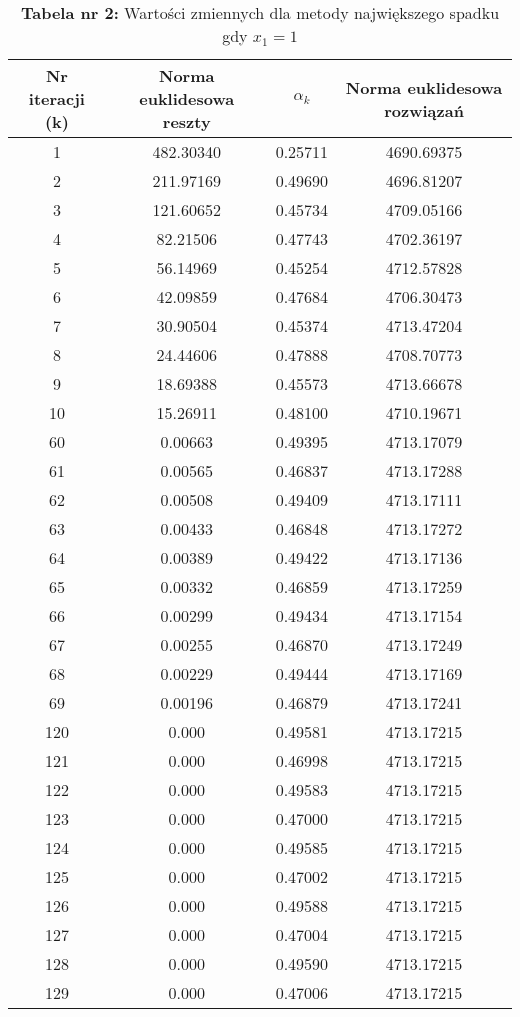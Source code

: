 \documentclass{article}
\begin{document}
\begin{table}[htbp]
\centering
\caption*{\textbf{Tabela nr 2:} Wartości zmiennych dla metody największego spadku gdy $x_1 = 1$}
\label{tab:moja_druga_tabela}
\begin{tabular}{cccc}
\toprule
Nr iteracji (k) & Norma euklidesowa reszty & $\alpha_k$ & Norma euklidesowa rozwiązań \\
\midrule
1 & 482.30340 & 0.25711 & 4690.69375 \\
2 & 211.97169 & 0.49690 & 4696.81207 \\
3 & 121.60652 & 0.45734 & 4709.05166 \\
4 & 82.21506 & 0.47743 & 4702.36197 \\
5 & 56.14969 & 0.45254 & 4712.57828 \\
6 & 42.09859 & 0.47684 & 4706.30473 \\
7 & 30.90504 & 0.45374 & 4713.47204 \\
8 & 24.44606 & 0.47888 & 4708.70773 \\
9 & 18.69388 & 0.45573 & 4713.66678 \\
10 & 15.26911 & 0.48100 & 4710.19671 \\
\midrule
60 & 0.00663 & 0.49395 & 4713.17079 \\
61 & 0.00565 & 0.46837 & 4713.17288 \\
62 & 0.00508 & 0.49409 & 4713.17111 \\
63 & 0.00433 & 0.46848 & 4713.17272 \\
64 & 0.00389 & 0.49422 & 4713.17136 \\
65 & 0.00332 & 0.46859 & 4713.17259 \\
66 & 0.00299 & 0.49434 & 4713.17154 \\
67 & 0.00255 & 0.46870 & 4713.17249 \\
68 & 0.00229 & 0.49444 & 4713.17169 \\
69 & 0.00196 & 0.46879 & 4713.17241 \\
\midrule
120 & 0.000 & 0.49581 & 4713.17215 \\
121 & 0.000 & 0.46998 & 4713.17215 \\
122 & 0.000 & 0.49583 & 4713.17215 \\
123 & 0.000 & 0.47000 & 4713.17215 \\
124 & 0.000 & 0.49585 & 4713.17215 \\
125 & 0.000 & 0.47002 & 4713.17215 \\
126 & 0.000 & 0.49588 & 4713.17215 \\
127 & 0.000 & 0.47004 & 4713.17215 \\
128 & 0.000 & 0.49590 & 4713.17215 \\
129 & 0.000 & 0.47006 & 4713.17215 \\
\bottomrule
\end{tabular}
\end{table}
\newpage
\end{document}
